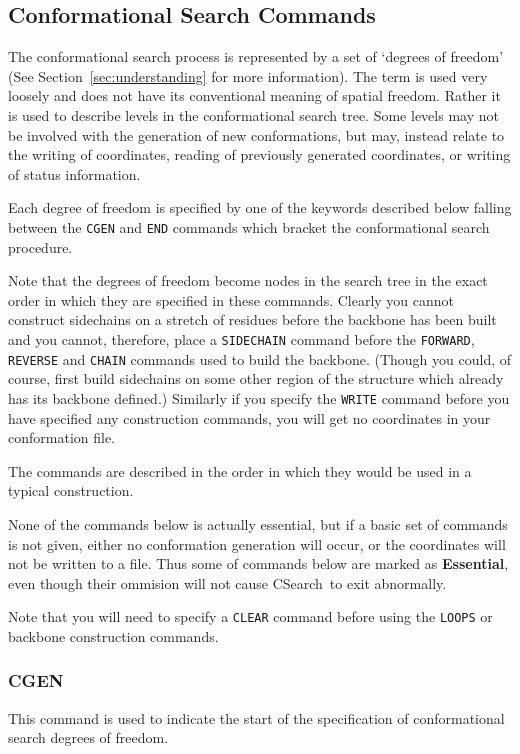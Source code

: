 \documentclass{report}
\newcommand{\cs}{CSearch}
\newcommand{\es}{\relax}
\begin{document}
\subsection{Conformational Search Commands}
The conformational search process is represented by a set of `degrees
of freedom' (See Section~\ref{sec:understanding} for more information).
The term is used very loosely and does not have its conventional meaning
of spatial freedom. Rather it is used to describe levels in the conformational
search tree. Some levels may not be involved with the generation of new
conformations, but may, instead relate to the writing of coordinates, reading
of previously generated coordinates, or writing of status information.

Each degree of freedom is specified by one of the keywords described below
falling between the {\tt CGEN} and {\tt END} commands which bracket the
conformational search procedure.

Note that the degrees of freedom become nodes in the search tree in the
exact order in which they are specified in these commands. Clearly you cannot
construct sidechains on a stretch of residues before the backbone has been
built and you cannot, therefore, place a {\tt SIDECHAIN} command before
the {\tt FORWARD}, {\tt REVERSE} and {\tt CHAIN} commands used to build the
backbone. (Though you could, of course, first build sidechains on some other 
region of the structure which already has its backbone defined.) Similarly
if you specify the {\tt WRITE} command before you have specified any
construction commands, you will get no coordinates in your conformation file.

The commands are described in the order in which they would be used in
a typical construction.

None of the commands below is actually essential, but if a basic set of
commands is not given, either no conformation generation will occur, or the
coordinates will not be written to a file. Thus some of commands below
are marked as {\bf Essential}, even though their ommision will not 
cause \cs\ to exit abnormally.

Note that you will need to specify a {\tt CLEAR} command before using the
{\tt LOOPS} or backbone construction commands.

\subsubsection{CGEN}
\es
This command is used to indicate the start of the specification of 
conformational search degrees of freedom.
\end{document}
